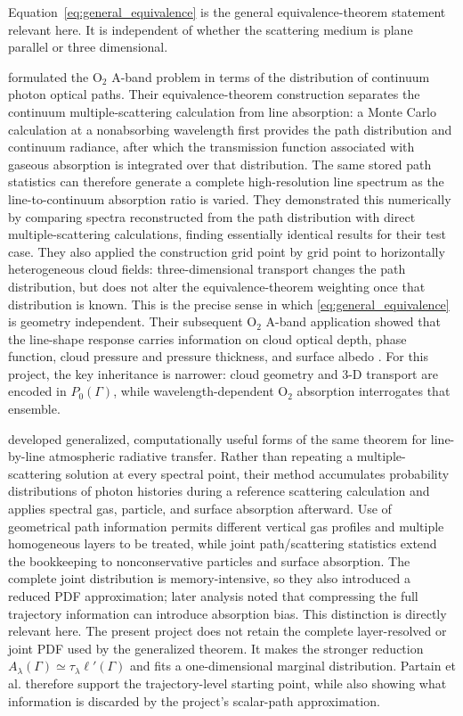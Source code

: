 \documentclass[11pt]{article}
\newcommand{\lp}{\ell'}
\begin{document}
Equation~\eqref{eq:general_equivalence} is the general equivalence-theorem
statement relevant here.  It is independent of whether the scattering medium
is plane parallel or three dimensional.

\citet{stephens2000} formulated the O$_2$ A-band problem in terms of the
distribution of continuum photon optical paths.  Their equivalence-theorem
construction separates the continuum multiple-scattering calculation from
line absorption: a Monte Carlo calculation at a nonabsorbing wavelength first
provides the path distribution and continuum radiance, after which the
transmission function associated with gaseous absorption is integrated over
that distribution.  The same stored path statistics can therefore generate a
complete high-resolution line spectrum as the line-to-continuum absorption
ratio is varied.  They demonstrated this numerically by comparing spectra
reconstructed from the path distribution with direct multiple-scattering
calculations, finding essentially identical results for their test case.  They
also applied the construction grid point by grid point to horizontally
heterogeneous cloud fields: three-dimensional transport changes the path
distribution, but does not alter the equivalence-theorem weighting once that
distribution is known.  This is the precise sense in which
\cref{eq:general_equivalence} is geometry independent.  Their subsequent O$_2$
A-band application showed that the line-shape response carries information on
cloud optical depth, phase function, cloud pressure and pressure thickness,
and surface albedo \citep{heidinger2000}.  For this project, the key inheritance
is narrower: cloud geometry and 3-D transport are encoded in $P_0(\Gamma)$,
while wavelength-dependent O$_2$ absorption interrogates that ensemble.

\citet{partain2000} developed generalized, computationally useful forms of the
same theorem for line-by-line atmospheric radiative transfer.  Rather than
repeating a multiple-scattering solution at every spectral point, their method
accumulates probability distributions of photon histories during a reference
scattering calculation and applies spectral gas, particle, and surface
absorption afterward.  Use of geometrical path information permits different
vertical gas profiles and multiple homogeneous layers to be treated, while
joint path/scattering statistics extend the bookkeeping to nonconservative
particles and surface absorption.  The complete joint distribution is
memory-intensive, so they also introduced a reduced PDF approximation; later
analysis noted that compressing the full trajectory information can introduce
absorption bias.  This distinction is directly relevant here.  The present
project does not retain the complete layer-resolved or joint PDF used by the
generalized theorem.  It makes the stronger reduction
$A_\lambda(\Gamma)\simeq\tau_\lambda\lp(\Gamma)$ and fits a one-dimensional
marginal distribution.  Partain et al. therefore support the trajectory-level
starting point, while also showing what information is discarded by the
project's scalar-path approximation.
\end{document}
